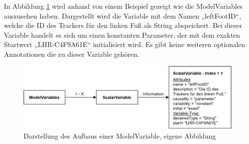 In Abbildung \ref{fig:ModelVariables} wird anhand von einem Beispiel gezeigt wie die ModelVariables auszusehen haben. Dargestellt wird die Variable mit dem Namen „leftFootID“, welche die ID des Trackers für den linken Fuß als String abspeichert. Bei dieser Variable handelt es sich um einen konstanten Parameter, der mit dem exakten Startwert „LHR-C4F9A61E“ initialisiert wird. Es gibt keine weiteren optionalen Annotationen die zu dieser Variable gehören.
\begin{figure}[h]
	\centering
	\includegraphics[width=1\linewidth]{Bilder/A30_ModelVariables}
	\caption{Darstellung des Aufbaus einer ModelVariable, eigene Abbildung}
	\label{fig:ModelVariables}
\end{figure}

